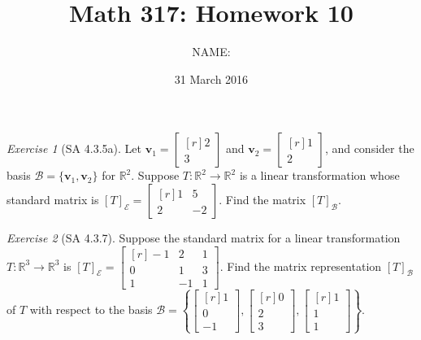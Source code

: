 \documentclass[fleqn,11pt]{paper}
\author         {NAME:                     }
\title{Math 317: Homework 10}
\date{31 March 2016}
\theoremstyle{remark}
\newtheorem*{exercise}{Exercise}
\newtheorem*{solution}{{\bf Solution}}
\newcommand\R{\fld{R}}
\renewcommand{\vec}[1]{\mathbf{#1}}
\newcommand{\<}{\ensuremath{\langle}}
\renewcommand{\>}{\ensuremath{\rangle}}
\newcommand\fld[1]{\ensuremath{\mathbb{#1}}}
\newcommand\vv{\vec{v}}
\newcommand\sB{\ensuremath{\mathcal B}}
\newcommand\sE{\ensuremath{\mathcal E}}
\begin{document}
\maketitle
\begin{exercise}[SA 4.3.5a]
  Let $\vv_1 = \begin{bmatrix*}[r]2\\3\end{bmatrix*}$
  and $\vv_2 = \begin{bmatrix*}[r]1\\2\end{bmatrix*}$,
  and consider the basis $\sB = \{\vv_1, \vv_2\}$ for $\R^2$.
  Suppose $T : \R^2 \to \R^2$ is a linear transformation whose standard matrix is 
$[T]_\sE = \begin{bmatrix*}[r]1& 5\\2 &-2 \end{bmatrix*}$.
    Find the matrix $[T]_\sB$.
\end{exercise}

\vskip5cm

\begin{exercise}[SA 4.3.7]
  Suppose the standard matrix for a linear transformation $T : \R^3 \to \R^3$ is
  $[T]_\sE = \begin{bmatrix*}[r]
-1 &2 &1\\
0 &1 &3\\
1 &-1& 1
  \end{bmatrix*}$.
Find the matrix representation $[T]_\sB$ of $T$ with respect to the basis
$\sB = \left\{
\begin{bmatrix*}[r]1\\0\\-1 \end{bmatrix*},
\begin{bmatrix*}[r]0\\2\\3 \end{bmatrix*},
\begin{bmatrix*}[r]1\\1\\1 \end{bmatrix*}\right\}$.
\end{exercise}
\end{document}
